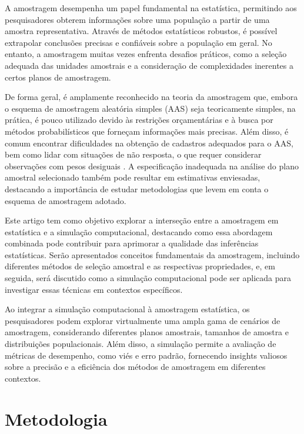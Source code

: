 \documentclass[sn-basic,pdflatex]{sn-jnl}
\theoremstyle{remark}
\theoremstyle{definition}
\begin{document}
A amostragem desempenha um papel fundamental na estatística, permitindo
aos pesquisadores obterem informações sobre uma população a partir de
uma amostra representativa. Através de métodos estatísticos robustos, é
possível extrapolar conclusões precisas e confiáveis sobre a população
em geral. No entanto, a amostragem muitas vezes enfrenta desafios
práticos, como a seleção adequada das unidades amostrais e a
consideração de complexidades inerentes a certos planos de amostragem.

De forma geral, é amplamente reconhecido na teoria da amostragem que,
embora o esquema de amostragem aleatória simples (AAS) seja teoricamente
simples, na prática, é pouco utilizado devido às restrições
orçamentárias e à busca por métodos probabilísticos que forneçam
informações mais precisas. Além disso, é comum encontrar dificuldades na
obtenção de cadastros adequados para o AAS, bem como lidar com situações
de não resposta, o que requer considerar observações com pesos desiguais
\citep{skinner2005design}. A especificação inadequada na análise do
plano amostral selecionado também pode resultar em estimativas
enviesadas, destacando a importância de estudar metodologias que levem
em conta o esquema de amostragem adotado.

Este artigo tem como objetivo explorar a interseção entre a amostragem
em estatística e a simulação computacional, destacando como essa
abordagem combinada pode contribuir para aprimorar a qualidade das
inferências estatísticas. Serão apresentados conceitos fundamentais da
amostragem, incluindo diferentes métodos de seleção amostral e as
respectivas propriedades, e, em seguida, será discutido como a simulação
computacional pode ser aplicada para investigar essas técnicas em
contextos específicos.

Ao integrar a simulação computacional à amostragem estatística, os
pesquisadores podem explorar virtualmente uma ampla gama de cenários de
amostragem, considerando diferentes planos amostrais, tamanhos de
amostra e distribuições populacionais. Além disso, a simulação permite a
avaliação de métricas de desempenho, como viés e erro padrão, fornecendo
insights valiosos sobre a precisão e a eficiência dos métodos de
amostragem em diferentes contextos.

\hypertarget{metodologia}{%
\section{Metodologia}\label{metodologia}}
\end{document}
